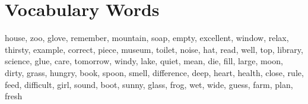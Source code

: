 \documentclass{article}
\begin{document}
\renewcommand{\familydefault}{\sfdefault}
\onehalfspacing
\fontsize{12pt}{14pt}\selectfont

\section*{Vocabulary Words}
\begin{addmargin}[1em]{1em}
house, zoo, glove, remember, mountain, soap, empty, excellent, window, relax, thirsty, example, correct, piece, museum, toilet, noise, hat, read, well, top, library, science, glue, care, tomorrow, windy, lake, quiet, mean, die, fill, large, moon, dirty, grass, hungry, book, spoon, smell, difference, deep, heart, health, close, rule, feed, difficult, girl, sound, boot, sunny, glass, frog, wet, wide, guess, farm, plan, fresh
\end{addmargin}
\end{document}
